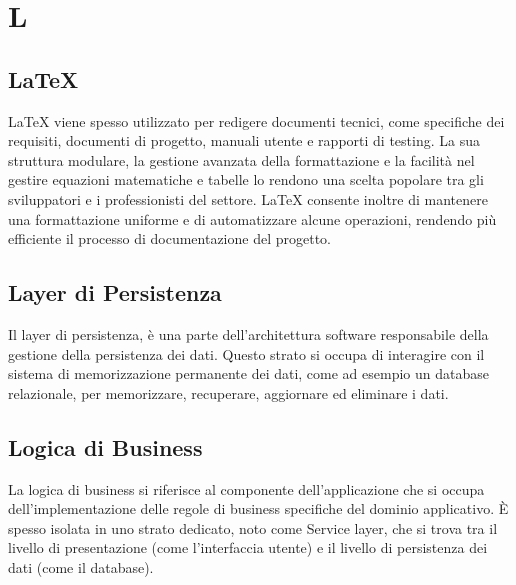 \section*{L} 
\subsection*{LaTeX} 
LaTeX viene spesso utilizzato per redigere documenti tecnici, come specifiche dei requisiti, documenti di progetto, manuali utente e rapporti di testing. La sua struttura modulare, la gestione avanzata della formattazione e la facilità nel gestire equazioni matematiche e tabelle lo rendono una scelta popolare tra gli sviluppatori e i professionisti del settore. LaTeX consente inoltre di mantenere una formattazione uniforme e di automatizzare alcune operazioni, rendendo più efficiente il processo di documentazione del progetto.
\subsection*{Layer di Persistenza} 
Il layer di persistenza, è una parte dell'architettura software responsabile della gestione della persistenza dei dati. Questo strato si occupa di interagire con il sistema di memorizzazione permanente dei dati, come ad esempio un database relazionale, per memorizzare, recuperare, aggiornare ed eliminare i dati.
\subsection*{Logica di Business} 
La logica di business si riferisce al componente dell'applicazione che si occupa dell'implementazione delle regole di business specifiche del dominio applicativo. È spesso isolata in uno strato dedicato, noto come Service layer, che si trova tra il livello di presentazione (come l'interfaccia utente) e il livello di persistenza dei dati (come il database).
